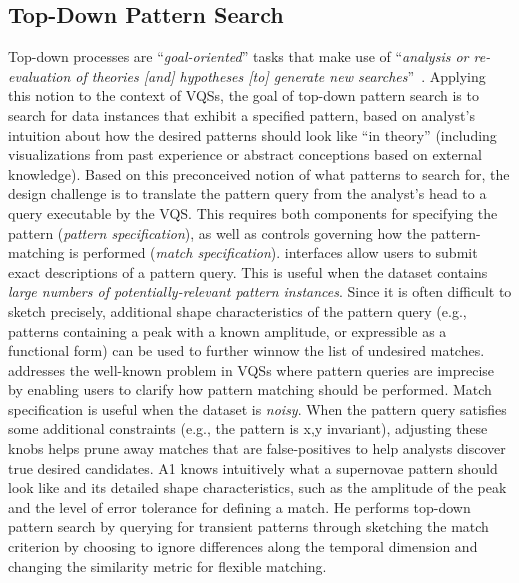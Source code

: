    \subsection{Top-Down Pattern Search}
   Top-down processes are ``\textit{goal-oriented}'' tasks that make use of ``\textit{analysis or re-evaluation of theories [and] hypotheses [to] generate new searches}''~\cite{Pirolli}. Applying this notion to the context of VQSs, the goal of top-down pattern search is to search for data instances that exhibit a specified pattern, based on analyst's intuition about how the desired patterns should look like ``in theory'' (including visualizations from past experience or abstract conceptions based on external knowledge). Based on this preconceived notion of what patterns to search for, the design challenge is to translate the pattern query from the analyst's head to a query executable by the VQS. This requires both components for specifying the pattern (\textit{pattern specification}), as well as controls governing how the pattern-matching is performed (\textit{match specification}).
    interfaces allow users to submit exact descriptions of a pattern query. This is useful when the dataset contains \emph{large numbers of potentially-relevant pattern instances}.
   Since it is often difficult to sketch precisely, additional shape characteristics of the pattern query (e.g., patterns containing a peak with a known amplitude, or expressible as a functional form) can be used to further winnow the list of undesired matches.%
    addresses the well-known problem in VQSs where pattern queries are imprecise~\cite{correll2016semantics,Holz2009,Eichmann2015} by enabling users to clarify how pattern matching should be performed. Match specification is useful when the dataset is \emph{noisy}. When the pattern query satisfies some additional constraints (e.g., the pattern is x,y invariant), adjusting these knobs helps prune away matches that are false-positives to help analysts discover true desired candidates.
    A1 knows intuitively what a supernovae pattern should look like and its detailed shape characteristics, such as the amplitude of the peak and the level of error tolerance for defining a match. He  performs top-down pattern search by querying for transient patterns through sketching the match criterion by choosing to ignore differences along the temporal dimension and changing the similarity metric for flexible matching.
